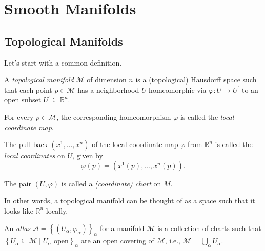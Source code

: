 \chapter{Smooth Manifolds}
\section{Topological Manifolds}
Let's start with a common definition.

\begin{definition}\label{def:topological-manifold}
	A \emph{topological manifold} \(\mathcal{M} \) of dimension \(n\) is a (topological) Hausdorff space such that each point \(p\in \mathcal{M} \) has a neighborhood \(U\) homeomorphic via \(\varphi\colon U \to U^\prime \) to an open subset \(U^\prime \subseteq \mathbb{R} ^n\).
	\begin{definition}\label{def:local-coordinate-map}
		For every \(p\in \mathcal{M} \), the corresponding homeomorphism \(\varphi \) is called the \emph{local coordinate map}.
	\end{definition}
	\begin{definition}\label{def:local-coordinate}
		The pull-back \((x^1, \ldots , x^n)\) of the \hyperref[def:local-coordinate-map]{local coordinate map} \(\varphi \) from \(\mathbb{R} ^n\) is called the \emph{local coordinates} on \(U\), given by
		\[
			\varphi (p) = (x^1(p), \ldots , x^n(p)).
		\]
	\end{definition}
	\begin{definition}\label{def:coordinate-chart}
		The pair \((U, \varphi )\) is called a \emph{(coordinate) chart} on \(M\).
	\end{definition}
\end{definition}

In other words, a \hyperref[def:topological-manifold]{topological manifold} can be thought of as a space such that it looks like \(\mathbb{R} ^n\) locally.

\begin{center}
\end{center}

\begin{definition}[Atlas]\label{def:atlas}
	An \emph{atlas} \(\mathcal{A} = \left\{ (U_\alpha , \varphi _\alpha) \right\}_\alpha \) for a \hyperref[def:topological-manifold]{manifold} \(\mathcal{M}\) is a collection of \hyperref[def:coordinate-chart]{charts} such that \(\left\{ U_\alpha\subseteq \mathcal{M} \mid U_\alpha \text{ open} \right\} _\alpha \) are an open covering of \(\mathcal{M} \), i.e., \(\mathcal{M} = \bigcup_{\alpha } U_\alpha \).
\end{definition}

